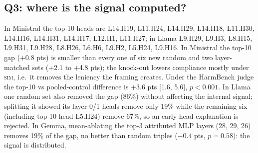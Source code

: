 \documentclass[10pt]{article}
\newcommand{\simu}{\textsc{sim}}
\begin{document}
\subsection{Q3: where is the signal computed?}
\begin{table}[h]\centering\small
\caption{Attribution and knock-outs (60 tasks $\times$ 5 wordings; OR-Bench $n=500$ for Llama/Gemma; AdvBench $n=520$ for Ministral).}
\label{tab:heads}
\end{table}
In Ministral the top-10 heads are L14.H19, L11.H24, L14.H29, L14.H18, L11.H30, L14.H16, L14.H31, L14.H17, L12.H1, L11.H27; in Llama
L9.H29, L9.H3, L8.H15, L9.H31, L9.H28, L8.H26, L6.H6, L9.H2, L5.H24, L9.H16. In Ministral the top-10 gap (+0.8 pts) is smaller than every one of
six new random and two layer-matched sets (+2.1 to +4.8 pts); the knock-out lowers compliance mostly under \simu{}, i.e.\ it removes the leniency the
framing creates. Under the HarmBench judge the top-10 vs pooled-control difference is +3.6 pts [1.6, 5.6], $p<0.001$.
In Llama one random set also removed the gap (86\%) without affecting the internal signal; splitting it showed its layer-0/1 heads remove only 19\%
while the remaining six (including top-10 head L5.H24) remove 67\%, so an early-head explanation is rejected.
In Gemma, mean-ablating the top-3 attributed MLP layers (28, 29, 26) removes 19\% of the gap, no better than random triples ($-0.4$ pts, $p=0.58$):
the signal is distributed.
\end{document}
